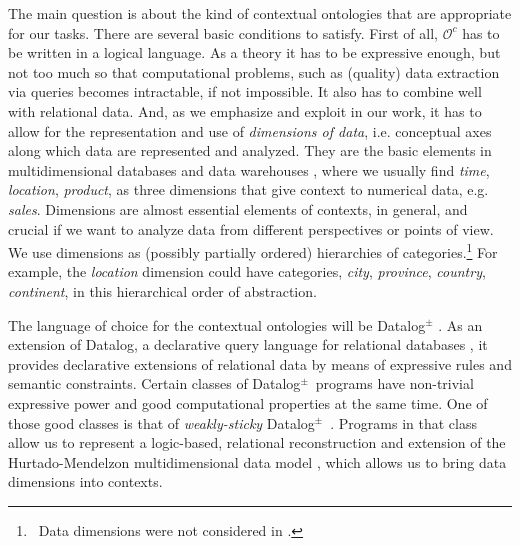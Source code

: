 \documentclass[format=acmsmall, review=false, screen=true]{acmart}
\newcommand{\mc}[1]{\mathcal{ #1}}
\newcommand{\dpm}{{Datalog}$^\pm$}
\newcommand{\red}[1]{{#1}}
\begin{document}
The main question is about the kind of contextual ontologies that are appropriate for our tasks. There are several basic conditions to satisfy.
First of all, $\mc{O}^c$ has to be written in a logical language. As a theory it has to be expressive enough, but not too much so that computational problems, such as (quality) data extraction via queries becomes intractable, if not impossible. It also has to combine well with relational data. And, as we emphasize and exploit in our work, it has to allow for the  representation and use of {\em dimensions of data}, \red{i.e. conceptual axes along which data are represented and analyzed. They are the basic elements in
multidimensional databases and data warehouses \cite{jensen}, where we usually find {\em time}, {\em location}, {\em product}, as three dimensions that give context to numerical data, e.g. {\em sales}.} Dimensions are almost essential elements of contexts, in general, and crucial if we want to analyze data from different perspectives or points of view. \red{We use dimensions as (possibly partially ordered) hierarchies of categories.}\footnote{\ Data dimensions were not considered in \cite{bertossi-brite,bertossi16}.} \red{For example, the {\em location} dimension could have categories, {\em city}, {\em province}, {\em country}, {\em continent}, in this hierarchical order of abstraction.}

The language of choice for the contextual ontologies will be Datalog$^\pm$ \cite{cali09}. As an extension of Datalog, a declarative query language for relational databases \cite{ceri}, it provides declarative
extensions of relational data by means of expressive rules and semantic constraints. Certain classes of \dpm \ programs have non-trivial expressive power and good computational properties at the same time.
One of those good classes is that of {\em weakly-sticky} \dpm~\cite{cali12}. Programs in that class allow us to represent a logic-based, relational reconstruction and extension of the Hurtado-Mendelzon  multidimensional data model \cite{hurtado-pods,hurtado-acm}, which allows us to bring data dimensions into contexts.
\end{document}
